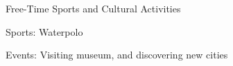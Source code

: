 \begin{cventries}

	\cventry
	{Free-Time} %
	{Sports and Cultural Activities} %
	{} %
	{} %
	{
		\begin{cvitems} %
            \item {Sports: Waterpolo}
            \item {Events: Visiting museum, and discovering new cities}
		\end{cvitems}
	}
    {}
\end{cventries}
